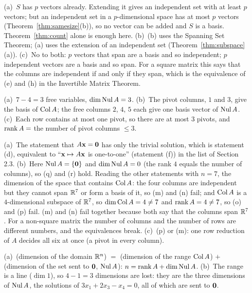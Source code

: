 \documentclass[11pt]{article}
\begin{document}
\begin{description}[leftmargin=0pt,itemsep=5pt]
  \item[Pause and think \ref{think:basisthm}.] (a)~$S$ has $p$ vectors already. Extending it gives an independent set with at least $p$ vectors; but an independent set in a $p$-dimensional space has at most $p$ vectors (Theorem~\ref{thm:samesize}(b)), so no vector can be added and $S$ is a basis. Theorem~\ref{thm:count} alone is enough here. (b)~(b) uses the Spanning Set Theorem; (a) uses the extension of an independent set (Theorem~\ref{thm:subspace}(a)). (c)~No to both: $p$ vectors that span are a basis and so independent; $p$ independent vectors are a basis and so span. For a square matrix this says that the columns are independent if and only if they span, which is the equivalence of (e) and (h) in the Invertible Matrix Theorem.
  \item[Pause and think \ref{think:pivfree}.] (a)~$7-4=3$ free variables, $\dim\operatorname{Nul} A=3$. (b)~The pivot columns, $1$ and $3$, give the basis of $\operatorname{Col} A$; the free columns $2$, $4$, $5$ each give one basis vector of $\operatorname{Nul} A$. (c)~Each row contains at most one pivot, so there are at most $3$ pivots, and $\operatorname{rank} A=$ the number of pivot columns $\le3$.
  \item[Pause and think \ref{think:imt}.] (a)~The statement that $A\mathbf{x}=\mathbf{0}$ has only the trivial solution, which is statement (d), equivalent to ``$\mathbf{x}\mapsto A\mathbf{x}$ is one-to-one'' (statement (f)) in the list of Section 2.3. (b)~Here $\operatorname{Nul} A=\{\mathbf{0}\}$ and $\dim\operatorname{Nul} A=0$ (the rank $4$ equals the number of columns), so (q) and (r) hold. Reading the other statements with $n=7$, the dimension of the space that contains $\operatorname{Col} A$: the four columns are independent but they cannot span $\mathbb{R}^7$ or form a basis of it, so (m) and (n) fail; and $\operatorname{Col} A$ is a $4$-dimensional subspace of $\mathbb{R}^7$, so $\dim\operatorname{Col} A=4\neq7$ and $\operatorname{rank} A=4\neq7$, so (o) and (p) fail. (m) and (n) fail together because both say that the columns span $\mathbb{R}^7$. For a non-square matrix the number of columns and the number of rows are different numbers, and the equivalences break. (c)~(p) or (m): one row reduction of $A$ decides all six at once (a pivot in every column).
  \item[Pause and think \ref{think:range}.] (a)~(dimension of the domain $\mathbb{R}^n$) $=$ (dimension of the range $\operatorname{Col} A$) $+$ (dimension of the set sent to $\mathbf{0}$, $\operatorname{Nul} A$): $n=\operatorname{rank} A+\dim\operatorname{Nul} A$. (b)~The range is a line ($\dim 1$), so $4-1=3$ dimensions are lost: they are the three dimensions of $\operatorname{Nul} A$, the solutions of $3x_1+2x_3-x_4=0$, all of which are sent to $\mathbf{0}$.

\end{description}
\end{document}

